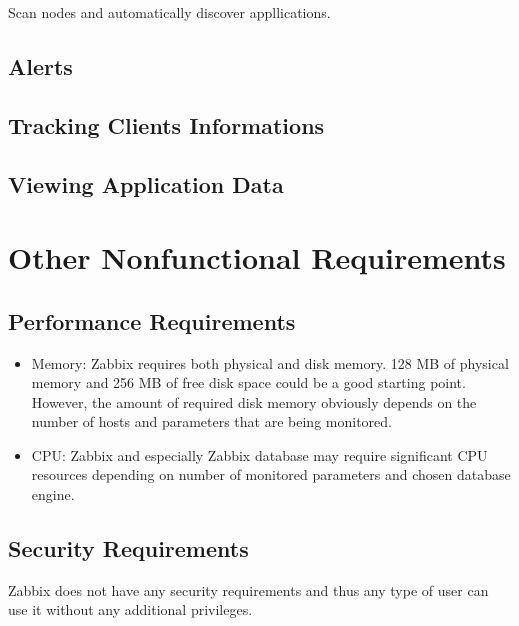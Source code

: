 \documentclass{article}
\begin{document}
Scan nodes and automatically discover appllications.


\subsection{Alerts}

\subsection{Tracking Clients Informations}

\subsection{Viewing Application Data}


\section{Other Nonfunctional Requirements}

\subsection{Performance Requirements}
\begin{itemize}
\item[]Memory:
    Zabbix requires both physical and disk memory. 128 MB of physical memory and 256 MB of free disk space could be a good starting point. However, the amount of required disk memory obviously depends on the number of hosts and parameters that are being monitored.
\item[]CPU:
   Zabbix and especially Zabbix database may require significant CPU resources depending on number of monitored parameters and chosen database engine.
   
 \end{itemize}
\subsection{Security Requirements}
Zabbix does not have any security requirements and thus any type of user can use it without any additional privileges.
\end{document}

